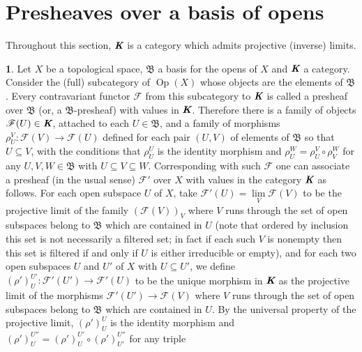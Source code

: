 \documentclass[12pt]{amsart}
\newcommand{\ou}{\operatorname{Op}}
\theoremstyle{definition}
\newtheorem{bk}[proposition]{}
\begin{document}
\section{Presheaves over a basis of opens}

Throughout this section, $\emph{\textbf{K}}$ is a category which admits  projective (inverse) limits.\\

\begin{bk}\label{I: 3.2.1} Let $X$ be a topological space, $\mathfrak{B}$ a basis for the opens of $X$ and $\emph{\textbf{K}}$ a category. Consider the (full) subcategory of $\ou(X)$ whose objects are the elements of $\mathfrak{B}$. Every contravariant functor $\mathscr{F}$ from this subcategory to $\emph{\textbf{K}}$ is called a presheaf over $\mathfrak{B}$ (or, a $\mathfrak{B}$-presheaf) with values in $\emph{\textbf{K}}$. Therefore there is a family of objects $\mathscr{F}(U)\in\emph{\textbf{K}}$, attached to each $U\in\mathfrak{B}$, and a family of morphisms $\rho_{U}^{V}:\mathscr{F}(V)\rightarrow\mathscr{F}(U)$ defined for each pair $(U,V)$ of elements of $\mathfrak{B}$ so that $U\subseteq V$, with the conditions that $\rho_{U}^{U}$ is the identity morphism and $\rho_{U}^{W}=\rho_{U}^{V}\circ\rho_{V}^{W}$ for any $U,V,W\in\mathfrak{B}$ with $U\subseteq V\subseteq W$.
Corresponding with such $\mathscr{F}$ one can associate a presheaf (in the usual sense) $\mathscr{F}'$ over $X$ with values in the category $\emph{\textbf{K}}$ as follows. For each open subspace $U$ of $X$, take $\mathscr{F}'(U)=\lim\limits_{V}\mathscr{F}(V)$ to be the projective limit of the family $(\mathscr{F}(V))_{V}$ where $V$ runs through the set of open subspaces belong to $\mathfrak{B}$ which are contained in $U$ (note that ordered by inclusion this set is not necessarily a filtered set; in fact if each such $V$ is nonempty then this set is filtered if and only if $U$ is either irreducible or empty), and for each two open subspaces $U$ and $U'$ of $X$ with $U\subseteq U'$, we define $(\rho')_{U}^{U'}:\mathscr{F}'(U')\rightarrow\mathscr{F}'(U)$ to be the unique morphism in $\emph{\textbf{K}}$ as the projective limit of the morphisms $\mathscr{F}'(U')\rightarrow\mathscr{F}(V)$ where $V$ runs through the set of open subspaces belong to $\mathfrak{B}$ which are contained in $U$. By the universal property of the projective limit, $(\rho')_{U}^{U}$ is the identity morphism and $(\rho')_{U}^{U''}=(\rho')_{U}^{U'}\circ(\rho')_{U'}^{U''}$ for any triple

\end{bk}
\end{document}
